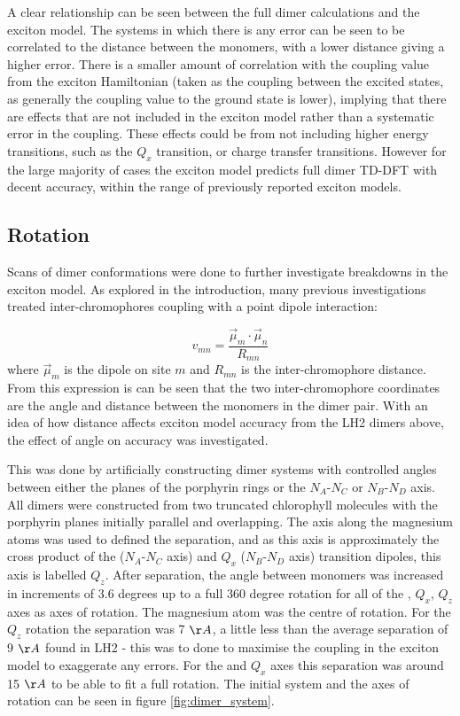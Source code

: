 A clear relationship can be seen between the full dimer calculations and the exciton
model. The systems in which there is any error can be seen to be correlated to the
distance between the monomers, with a lower distance giving a higher error. There 
is a smaller amount of correlation with the coupling value from the exciton Hamiltonian
(taken as the coupling between the excited states, as generally the coupling value
to the ground state is lower), implying that there are effects that are not included
in the exciton model rather than a systematic error in the coupling. These effects
could be from not including higher energy transitions, such as the $Q_x$ transition,
or charge transfer transitions. However for the large majority of cases the exciton
model predicts full dimer TD-DFT with decent accuracy, within the range of previously
reported exciton models.

\subsection{Rotation}
\label{subsec:rotation}

Scans of dimer conformations were done to further investigate breakdowns in the
exciton model. As explored in the introduction, many previous investigations treated
inter-chromophores coupling with a point dipole interaction:

\begin{equation}
    v_{mn} = \frac{\vec{\mu}_m \cdot \vec{\mu}_n}{R_{mn}}
\end{equation}
%
where $\vec{\mu}_m$ is the dipole on site $m$ and $R_{mn}$ is the inter-chromophore
distance. From this expression is can be seen that the two inter-chromophore coordinates
are the angle and distance between the monomers in the dimer pair. With an idea
of how distance affects exciton model accuracy from the LH2 dimers above, the effect 
of angle on accuracy was investigated.

This was done by artificially constructing dimer systems with controlled angles 
between either the planes of the porphyrin rings or the $N_A$-$N_C$ or $N_B$-$N_D$
axis. All dimers were constructed from two truncated chlorophyll molecules with 
the porphyrin planes initially parallel and overlapping. The axis along the magnesium
atoms was used to defined the separation, and as this axis is approximately the 
cross product of the \Qy ($N_A$-$N_C$ axis) and $Q_x$ ($N_B$-$N_D$ axis) transition
dipoles, this axis is labelled $Q_z$. After separation, the angle between monomers
was increased in increments of 3.6 degrees up to a full 360 degree rotation for 
all of the \Qy, $Q_x$, $Q_z$ axes as axes of rotation. The magnesium atom was the 
centre of rotation. For the $Q_z$ rotation the separation was 7 $\AA{}$, a little 
less than the average separation of 9 $\AA{}$ found in LH2 - this was to done to 
maximise the coupling in the exciton model to exaggerate any errors. For the \Qy
and $Q_x$ axes this separation was around 15 $\AA{}$ to be able to fit a full rotation.
The initial system and the axes of rotation can be seen in figure \ref{fig:dimer_system}.

